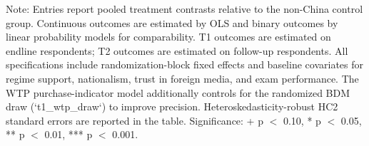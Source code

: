 \begin{table}[H]
\begin{threeparttable}
\begin{tablenotes}[flushleft]
\footnotesize
\item Note: Entries report pooled treatment contrasts relative to the non-China control group. Continuous outcomes are estimated by OLS and binary outcomes by linear probability models for comparability. T1 outcomes are estimated on endline respondents; T2 outcomes are estimated on follow-up respondents. All specifications include randomization-block fixed effects and baseline covariates for regime support, nationalism, trust in foreign media, and exam performance. The WTP purchase-indicator model additionally controls for the randomized BDM draw (`t1_wtp_draw`) to improve precision. Heteroskedasticity-robust HC2 standard errors are reported in the table. Significance: + p $<$ 0.10, * p $<$ 0.05, ** p $<$ 0.01, *** p $<$ 0.001.
\end{tablenotes}
\end{threeparttable}
\end{table}
